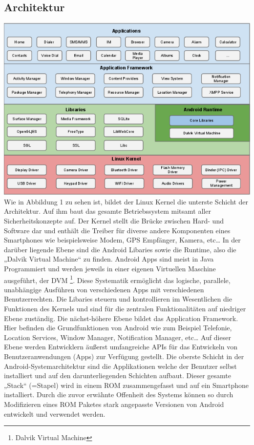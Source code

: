 \subsection{Architektur}
\includegraphics[scale=0.7]{Images/android_stack}
Wie in Abbildung 1 zu sehen ist, bildet der Linux Kernel die unterste Schicht der Architektur. Auf ihm baut das gesamte Betriebssystem mitsamt aller Sicherheitskonzepte auf. Der Kernel stellt die Brücke zwischen Hard- und Software dar und enthält die Treiber für diverse andere Komponenten eines Smartphones wie beispielsweise Modem, GPS Empfänger, Kamera, etc… \newline
In der darüber liegende Ebene sind die Android Libaries sowie die Runtime, also die „Dalvik Virtual Machine“ zu finden. \newline
Android Apps sind meist in Java Programmiert und werden jeweils in einer eigenen Virtuellen Maschine ausgeführt, der DVM \footnote{Dalvik Virtual Machine}. Diese Systematik ermöglicht das logische, parallele, unabhängige Ausführen von verschiedenen Apps mit verschiedenen Benutzerrechten.
Die Libaries steuern und kontrollieren im Wesentlichen die Funktionen des Kernels und sind für die zentralen Funktionalitäten auf niedriger Ebene zuständig.\newline
Die nächst-höhere Ebene bildet das Application Framework. Hier befinden die Grundfunktionen von Android wie zum Beispiel Telefonie, Location Services, Window Manager, Notification Manager, etc… 
Auf dieser Ebene werden Entwicklern äußerst umfangreiche APIs für das Entwickeln von Benutzeranwendungen (Apps) zur Verfügung gestellt. \newline
Die oberste Schicht in der Android-Systemarchitektur sind die Applikationen welche der Benutzer selbst installiert und auf den darunterliegenden Schichten aufbaut.
Dieser gesamte „Stack“ (=Stapel) wird in einem ROM zusammengefasst und auf ein Smartphone installiert. Durch die zuvor erwähnte Offenheit des Systems können so durch Modifizieren eines ROM Paketes stark angepasste Versionen von Android entwickelt und verwendet werden.


